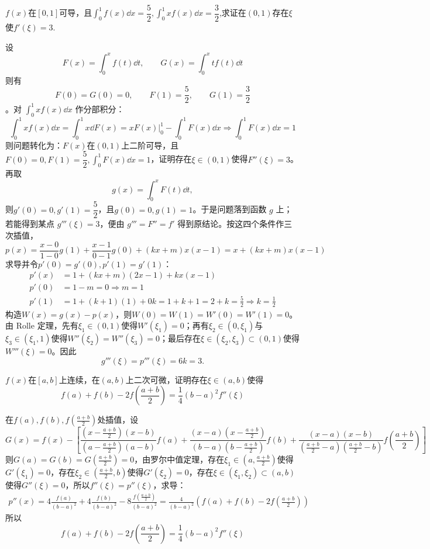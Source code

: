 \newpage
\begin{example}[$f'(\xi)=3$]
    $f(x)$在$[0,1]$可导，且$\displaystyle \int_0^1f(x)\dd x=\dfrac52,\int_0^1 xf(x)\dd x=\dfrac32$,求证在$(0,1)$存在$\xi$使$f'(\xi)=3$.
\end{example}
\begin{solution}
设\[F(x)=\displaystyle\int_0^xf(t)\dd t,\qquad G(x)=\displaystyle\int_0^xtf(t)\dd t\]则有\[F(0)=G(0)=0,\qquad F(1)=\dfrac52,\qquad G(1)=\dfrac32\]。对 $\int_0^1xf(x)\dd x$ 作分部积分：
\[\int_0^1xf(x)\dd x=\int_0^1x\dd F(x)=\left.xF(x)\right|_0^1-\int_0^1F(x)\dd x\Rightarrow \int_0^1F(x)\dd x=1\]
则问题转化为：$F(x)$在$(0,1)$上二阶可导，且$F(0)=0,F(1)=\dfrac52,\displaystyle\int_0^1F(x)\dd x=1$，证明存在$\xi\in(0,1)$使得$F''(\xi)=3$。
再取
\[
g(x)=\int_0^xF(t)\dd t,
\]
则$g'(0)=0,g'(1)=\dfrac52$，且$g(0)=0,g(1)=1$。于是问题落到函数 $g$ 上；若能得到某点 $g'''(\xi)=3$，便由 $g'''=F''=f'$ 得到原结论。按这四个条件作三次插值，
\[p(x)=\frac{x-0}{1-0}g(1)+\frac{x-1}{0-1}g(0)+(kx+m)x(x-1)=x+(kx+m)x(x-1)\]
求导并令$p'(0)=g'(0),p'(1)=g'(1)$：
\begin{align*}
p'(x)&=1+(kx+m)(2x-1)+k x(x-1)\\
p'(0)&=1- m = 0\Rightarrow m=1\\
p'(1)&=1 + (k+1)(1)+0k=1 + k + 1 = 2 + k = \frac52\Rightarrow k=\frac12
\end{align*}
构造$W(x)=g(x)-p(x)$，则$W(0)=W(1)=W'(0)=W'(1)=0$。由 Rolle 定理，先有$\xi_1\in(0,1)$使得$W'(\xi_1)=0$；再有$\xi_2\in(0,\xi_1)$与$\xi_3\in(\xi_1,1)$使得$W''(\xi_2)=W''(\xi_3)=0$；最后存在$\xi\in(\xi_2,\xi_3)\subset(0,1)$使得$W'''(\xi)=0$。因此
\[
g'''(\xi)=p'''(\xi)=6k=3.
\]
\end{solution}
\newpage
\begin{example}[$f(a)+f(b)-2f\left(\frac{a+b}{2}\right)=\frac14(b-a)^2f''(\xi)$]
$f(x)$在$[a,b]$上连续，在$(a,b)$上二次可微，证明存在$\xi\in(a,b)$使得
\[f(a)+f(b)-2f\left(\frac{a+b}{2}\right)=\frac14(b-a)^2f''(\xi)\]
\end{example}
\begin{solution}
在$f(a),f(b),f\left(\frac{a+b}{2}\right)$处插值，设
\[G(x)=f(x)-\left[\frac{(x-\frac{a+b}{2})(x-b)}{(a-\frac{a+b}{2})(a-b)}f(a)+\frac{(x-a)(x-\frac{a+b}{2})}{(b-a)(b-\frac{a+b}{2})}f(b)+\frac{(x-a)(x-b)}{(\frac{a+b}{2}-a)(\frac{a+b}{2}-b)}f\left(\frac{a+b}{2}\right)\right]\]
则$G(a)=G(b)=G\left(\frac{a+b}{2}\right)=0$，由罗尔中值定理，存在$\xi_1\in(a,\frac{a+b}{2})$使得$G'(\xi_1)=0$，存在$\xi_2\in(\frac{a+b}{2},b)$使得$G'(\xi_2)=0$，存在$\xi\in(\xi_1,\xi_2)\subset(a,b)$使得$G''(\xi)=0$，所以$f''(\xi)=p''(\xi)$，求导：
\begin{align*}
    p''(x)=4\frac{f(a)}{(b-a)^2}+4\frac{f(b)}{(b-a)^2}-8\frac{f\left(\frac{a+b}{2}\right)}{(b-a)^2}=\frac{4}{(b-a)^2}\left(f(a)+f(b)-2f\left(\frac{a+b}{2}\right)\right)
\end{align*}
所以\[f(a)+f(b)-2f\left(\frac{a+b}{2}\right)=\frac14(b-a)^2f''(\xi)\]
\end{solution}

